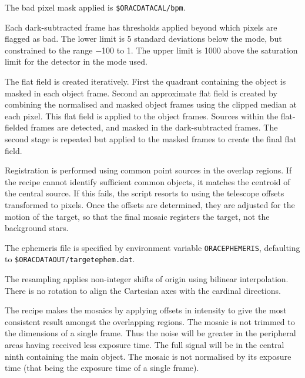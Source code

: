 \documentclass[twoside,11pt]{article}
\renewcommand{\_}{\texttt{\symbol{95}}}
\newcommand{\sstitem}{\item}
\begin{document}
{{{         \sstitem
         The bad pixel mask applied is {\tt\$ORAC\_DATA\_CAL/bpm}.

         \sstitem
         Each dark-subtracted frame has thresholds applied beyond which
         pixels are flagged as bad.  The lower limit is 5 standard
         deviations below the mode, but constrained to the range $-$100 to 1.
         The upper limit is 1000 above the saturation limit for the detector
         in the mode used.

         \sstitem
         The flat field is created iteratively.  First the quadrant
         containing the object is masked in each object frame.  Second an
         approximate flat field is created by combining the normalised
         and masked object frames using the clipped median at each pixel.
         This flat field is applied to the object frames.  Sources within
         the flat-fielded frames are detected, and masked in the
         dark-subtracted frames.  The second stage is repeated but applied
         to the masked frames to create the final flat field.

         \sstitem
         Registration is performed using common point sources in the
         overlap regions.  If the recipe cannot identify sufficient common
         objects, it matches the centroid of the central source.  If this
         fails, the script resorts to using the telescope offsets
         transformed to pixels.  Once the offsets are determined, they
         are adjusted for the motion of the target, so that the final
         mosaic registers the target, not the background stars.

         \sstitem
         The ephemeris file is specified by environment variable
         {\tt{ORAC\_EPHEMERIS}}, defaulting to {\tt\$ORAC\_DATA\_OUT/target\_ephem.dat}.

         \sstitem
         The resampling applies non-integer shifts of origin using
         bilinear interpolation.  There is no rotation to align the
         Cartesian axes with the cardinal directions.

         \sstitem
         The recipe makes the mosaics by applying offsets in intensity
         to give the most consistent result amongst the overlapping regions.
         The mosaic is not trimmed to the dimensions of a single frame.  Thus
         the noise will be greater in the peripheral areas having received
         less exposure time.  The full signal will be in the central ninth
         containing the main object.  The mosaic is not normalised by its
         exposure time (that being the exposure time of a single frame).

}}}
\end{document}

